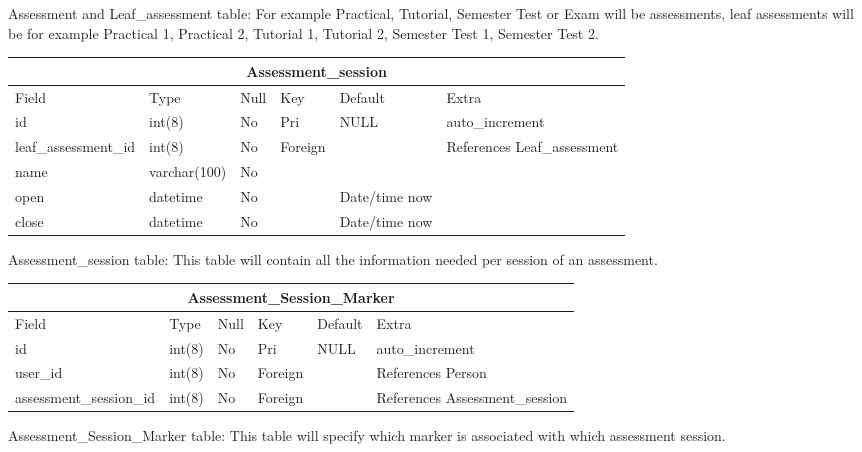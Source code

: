 Assessment and Leaf\_assessment table:
For example Practical, Tutorial, Semester Test or Exam will be assessments, leaf assessments will be for example Practical 1, Practical 2, Tutorial 1, Tutorial 2, Semester Test 1, Semester Test 2.

\begin{table}[ht]
\begin{tabular}[c]{|p{3cm}||p{2.1cm}||p{1.2cm}||p{1.5cm}||p{2cm}|p{4cm}|}
  \hline
  \multicolumn{6}{|c|}{Assessment\_session} \\
  \hline 
  Field & Type & Null & Key & Default & Extra \\ [0.5ex] %
  \hline
  id & int(8) & No & Pri & NULL & auto\_increment \\
  leaf\_assessment\_id & int(8) & No & Foreign & & References Leaf\_assessment \\
  name & varchar(100) & No & & & \\
  open & datetime & No & & Date/time now & \\
  close & datetime & No & & Date/time now & \\
  \hline
\end{tabular}
\end{table} 

Assessment\_session table:
This table will contain all the information needed per session of an assessment.

\begin{table}[ht]
\begin{tabular}[c]{|p{3cm}||p{2.1cm}||p{1.2cm}||p{1.5cm}||p{2cm}|p{4cm}|}
  \hline
  \multicolumn{6}{|c|}{Assessment\_Session\_Marker} \\
  \hline 
  Field & Type & Null & Key & Default & Extra \\ [0.5ex] %
  \hline
  id & int(8) & No & Pri & NULL & auto\_increment \\
  user\_id & int(8) & No & Foreign & & References Person\\
  assessment\_session\_id & int(8) & No & Foreign & & References Assessment\_session \\
  \hline
\end{tabular}
\end{table} 

Assessment\_Session\_Marker table:
This table will specify which marker is associated with which assessment session.

